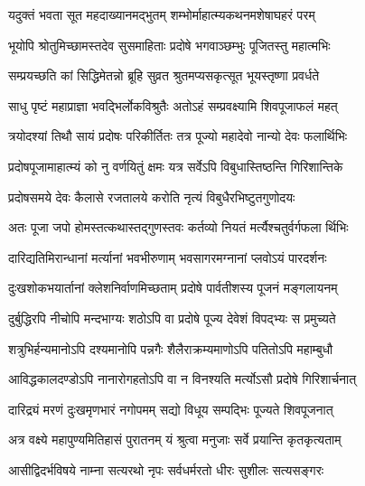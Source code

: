 \label{sec:pradosha_katha}

\begin{center}


\twolineshloka
{यदुक्तं भवता सूत महदाख्यानमद्भुतम्}
{शम्भोर्माहात्म्यकथनमशेषाघहरं परम्} %

\twolineshloka
{भूयोपि श्रोतुमिच्छामस्तदेव सुसमाहिताः}
{प्रदोषे भगवाञ्छम्भुः पूजितस्तु महात्मभिः} %

\twolineshloka
{सम्प्रयच्छति कां सिद्धिमेतन्नो ब्रूहि सुव्रत}
{श्रुतमप्यसकृत्सूत भूयस्तृष्णा प्रवर्धते} %

\twolineshloka
{साधु पृष्टं महाप्राज्ञा भवद्भिर्लोकविश्रुतैः}
{अतोऽहं सम्प्रवक्ष्यामि शिवपूजाफलं महत्} %

\twolineshloka
{त्रयोदश्यां तिथौ सायं प्रदोषः परिकीर्तितः}
{तत्र पूज्यो महादेवो नान्यो देवः फलार्थिभिः} %

\twolineshloka
{प्रदोषपूजामाहात्म्यं को नु वर्णयितुं क्षमः}
{यत्र सर्वेऽपि विबुधास्तिष्ठन्ति गिरिशान्तिके} %

\twolineshloka
{प्रदोषसमये देवः कैलासे रजतालये}
{करोति नृत्यं विबुधैरभिष्टुतगुणोदयः} %

\twolineshloka
{अतः पूजा जपो होमस्तत्कथास्तद्गुणस्तवः}
{कर्तव्यो नियतं मर्त्यैश्चतुर्वर्गफला र्थिभिः} %

\twolineshloka
{दारिद्यतिमिरान्धानां मर्त्यानां भवभीरुणाम्}
{भवसागरमग्नानां प्लवोऽयं पारदर्शनः} %

\twolineshloka
{दुःखशोकभयार्तानां क्लेशनिर्वाणमिच्छताम्}
{प्रदोषे पार्वतीशस्य पूजनं मङ्गलायनम्} %

\twolineshloka
{दुर्बुद्धिरपि नीचोपि मन्दभाग्यः शठोऽपि वा}
{प्रदोषे पूज्य देवेशं विपद्भ्यः स प्रमुच्यते} %

\twolineshloka
{शत्रुभिर्हन्यमानोऽपि दश्यमानोपि पन्नगैः}
{शैलैराक्रम्यमाणोऽपि पतितोऽपि महाम्बुधौ} %

\twolineshloka
{आविद्धकालदण्डोऽपि नानारोगहतोऽपि वा}
{न विनश्यति मर्त्योऽसौ प्रदोषे गिरिशार्चनात्} %

\twolineshloka
{दारिद्र्यं मरणं दुःखमृणभारं नगोपमम्}
{सद्यो विधूय सम्पद्भिः पूज्यते शिवपूजनात्} %

\twolineshloka
{अत्र वक्ष्ये महापुण्यमितिहासं पुरातनम्}
{यं श्रुत्वा मनुजाः सर्वे प्रयान्ति कृतकृत्यताम्} %

\twolineshloka
{आसीद्विदर्भविषये नाम्ना सत्यरथो नृपः}
{सर्वधर्मरतो धीरः सुशीलः सत्यसङ्गरः} %


\end{center}
